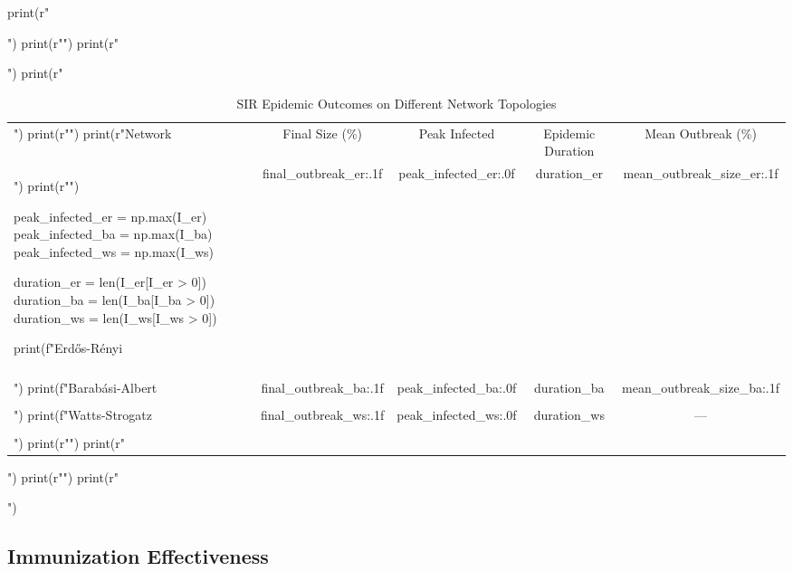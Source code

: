 \documentclass[a4paper, 11pt]{article}
\begin{document}
\begin{pycode}
print(r"\begin{table}[htbp]")
print(r"\centering")
print(r"\caption{SIR Epidemic Outcomes on Different Network Topologies}")
print(r"\begin{tabular}{lcccc}")
print(r"\toprule")
print(r"Network & Final Size (\%) & Peak Infected & Epidemic Duration & Mean Outbreak (\%) \\")
print(r"\midrule")

peak_infected_er = np.max(I_er)
peak_infected_ba = np.max(I_ba)
peak_infected_ws = np.max(I_ws)

duration_er = len(I_er[I_er > 0])
duration_ba = len(I_ba[I_ba > 0])
duration_ws = len(I_ws[I_ws > 0])

print(f"Erdős-Rényi & {final_outbreak_er:.1f} & {peak_infected_er:.0f} & {duration_er} & {mean_outbreak_size_er:.1f} \\\\")
print(f"Barabási-Albert & {final_outbreak_ba:.1f} & {peak_infected_ba:.0f} & {duration_ba} & {mean_outbreak_size_ba:.1f} \\\\")
print(f"Watts-Strogatz & {final_outbreak_ws:.1f} & {peak_infected_ws:.0f} & {duration_ws} & --- \\\\")
print(r"\bottomrule")
print(r"\end{tabular}")
print(r"\label{tab:epidemic_outcomes}")
print(r"\end{table}")
\end{pycode}

\subsection{Immunization Effectiveness}
\end{document}
